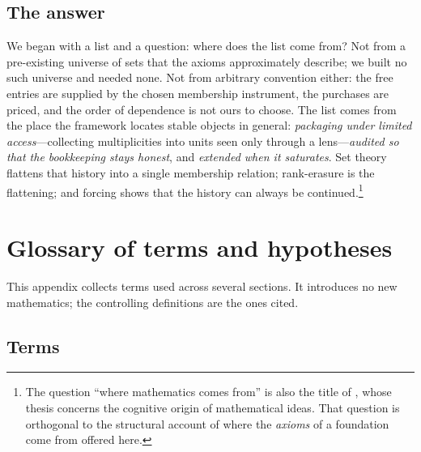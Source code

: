 \documentclass[11pt]{article}
\theoremstyle{definition}
\begin{document}
\subsection{The answer}

We began with a list and a question: where does the list come from? Not from a pre-existing
universe of sets that the axioms approximately describe; we built no such universe and needed
none. Not from arbitrary convention either: the free entries are supplied by the chosen membership
instrument, the purchases are priced, and the order of dependence is not ours to choose. The list
comes from the place the framework locates stable objects in general: \emph{packaging under limited
access}---collecting multiplicities into units seen only through a lens---\emph{audited so that the
bookkeeping stays honest}, and \emph{extended when it saturates}. Set theory flattens that history
into a single membership relation; rank-erasure is the flattening; and forcing shows that the
history can always be continued.\footnote{The question ``where mathematics comes from'' is also
the title of \citet{LakoffNunez2000}, whose thesis concerns the cognitive origin of mathematical
ideas. That question is orthogonal to the structural account of where the \emph{axioms} of a
foundation come from offered here.}
 
\appendix
\section{Glossary of terms and hypotheses}\label{app:definitions}

This appendix collects terms used across several sections. It introduces no new mathematics; the
controlling definitions are the ones cited.

\subsection{Terms}\label{subsec:definitions-list}
\end{document}
